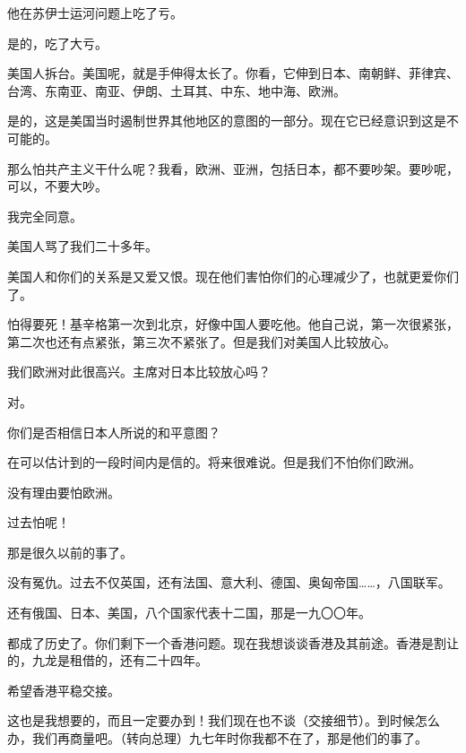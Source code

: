 他在苏伊士运河问题上吃了亏。

是的，吃了大亏。

美国人拆台。美国呢，就是手伸得太长了。你看，它伸到日本、南朝鲜、菲律宾、台湾、东南亚、南亚、伊朗、土耳其、中东、地中海、欧洲。

是的，这是美国当时遏制世界其他地区的意图的一部分。现在它已经意识到这是不可能的。

那么怕共产主义干什么呢？我看，欧洲、亚洲，包括日本，都不要吵架。要吵呢，可以，不要大吵。

我完全同意。

美国人骂了我们二十多年。

美国人和你们的关系是又爱又恨。现在他们害怕你们的心理减少了，也就更爱你们了。

怕得要死！基辛格第一次到北京，好像中国人要吃他。他自己说，第一次很紧张，第二次也还有点紧张，第三次不紧张了。但是我们对美国人比较放心。

我们欧洲对此很高兴。主席对日本比较放心吗？

对。

你们是否相信日本人所说的和平意图？

在可以估计到的一段时间内是信的。将来很难说。但是我们不怕你们欧洲。

没有理由要怕欧洲。

过去怕呢！

那是很久以前的事了。

没有冤仇。过去不仅英国，还有法国、意大利、德国、奥匈帝国……，八国联军。

还有俄国、日本、美国，八个国家代表十二国，那是一九〇〇年。

都成了历史了。你们剩下一个香港问题。现在我想谈谈香港及其前途。香港是割让的，九龙是租借的，还有二十四年。

希望香港平稳交接。

这也是我想要的，而且一定要办到！我们现在也不谈（交接细节）。到时候怎么办，我们再商量吧。（转向总理）九七年时你我都不在了，那是他们的事了。

